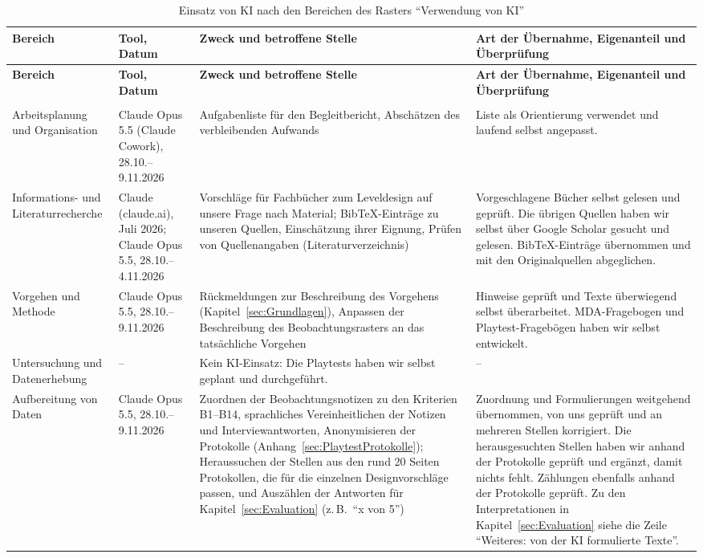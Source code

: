 \documentclass[../Main.tex]{subfiles}
\begin{document}
{\small
    \renewcommand{\arraystretch}{1.3}
    \begin{longtable}{|>{\raggedright\arraybackslash}p{2.3cm}|>{\raggedright\arraybackslash}p{2.4cm}|>{\raggedright\arraybackslash}p{4.4cm}|>{\raggedright\arraybackslash}p{4.6cm}|}
        \hline
        \textbf{Bereich} & \textbf{Tool, Datum} & \textbf{Zweck und betroffene Stelle} & \textbf{Art der Übernahme, Eigenanteil und Überprüfung} \\
        \hline
        \endfirsthead
        \hline
        \textbf{Bereich} & \textbf{Tool, Datum} & \textbf{Zweck und betroffene Stelle} & \textbf{Art der Übernahme, Eigenanteil und Überprüfung} \\
        \hline
        \endhead
        \multicolumn{4}{r}{\textit{Fortsetzung auf der nächsten Seite}} \\
        \endfoot
        \caption{Einsatz von KI nach den Bereichen des Rasters \enquote{Verwendung von KI}}
        \label{tab:KI}
        \endlastfoot
        Arbeitsplanung und Organisation & Claude Opus 5.5 (Claude Cowork), 28.10.--9.11.2026 & Aufgabenliste für den Begleitbericht, Abschätzen des verbleibenden Aufwands & Liste als Orientierung verwendet und laufend selbst angepasst. \\
        \hline
        Informations- und Literaturrecherche & Claude (claude.ai), Juli 2026; Claude Opus 5.5, 28.10.--4.11.2026 & Vorschläge für Fachbücher zum Leveldesign auf unsere Frage nach Material; BibTeX-Einträge zu unseren Quellen, Einschätzung ihrer Eignung, Prüfen von Quellenangaben (Literaturverzeichnis) & Vorgeschlagene Bücher selbst gelesen und geprüft. Die übrigen Quellen haben wir selbst über Google Scholar gesucht und gelesen. BibTeX-Einträge übernommen und mit den Originalquellen abgeglichen. \\
        \hline
        Vorgehen und Methode & Claude Opus 5.5, 28.10.--9.11.2026 & Rückmeldungen zur Beschreibung des Vorgehens (Kapitel~\ref{sec:Grundlagen}), Anpassen der Beschreibung des Beobachtungsrasters an das tatsächliche Vorgehen & Hinweise geprüft und Texte überwiegend selbst überarbeitet. MDA-Fragebogen und Playtest-Fragebögen haben wir selbst entwickelt. \\
        \hline
        Untersuchung und Datenerhebung & -- & Kein KI-Einsatz: Die Playtests haben wir selbst geplant und durchgeführt. & -- \\
        \hline
        Aufbereitung von Daten & Claude Opus 5.5, 28.10.--9.11.2026 & Zuordnen der Beobachtungsnotizen zu den Kriterien B1--B14, sprachliches Vereinheitlichen der Notizen und Interviewantworten, Anonymisieren der Protokolle (Anhang~\ref{sec:PlaytestProtokolle}); Heraussuchen der Stellen aus den rund 20 Seiten Protokollen, die für die einzelnen Designvorschläge passen, und Auszählen der Antworten für Kapitel~\ref{sec:Evaluation} (z.\,B.\ \enquote{x von 5}) & Zuordnung und Formulierungen weitgehend übernommen, von uns geprüft und an mehreren Stellen korrigiert. Die herausgesuchten Stellen haben wir anhand der Protokolle geprüft und ergänzt, damit nichts fehlt. Zählungen ebenfalls anhand der Protokolle geprüft. Zu den Interpretationen in Kapitel~\ref{sec:Evaluation} siehe die Zeile \enquote{Weiteres: von der KI formulierte Texte}. \\

\end{longtable}}
\end{document}
